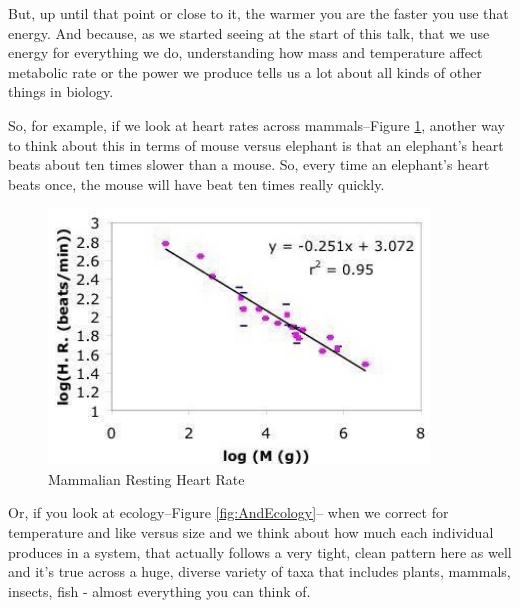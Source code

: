 \documentclass[]{article}
\begin{document}
But, up until that point or close to it,
the warmer you are
the faster you use that energy.
And because, as we started seeing
at the start of this talk,
that we use energy for everything we do,
understanding how mass
and temperature affect metabolic rate
or the power we produce
tells us a lot about all kinds of
other things in biology.

So, for example, if we look at
heart rates across mammals--Figure \ref{fig:MammalianRestingHeartRate},
another way to think about this
in terms of mouse versus elephant
is that an elephant's heart beats
about ten times slower than a mouse.
So, every time an elephant's heart
beats once,
the mouse will have beat
ten times really quickly.


\begin{figure}[H]
	\caption[Mammalian Resting Heart Rate]{Mammalian Resting Heart Rate\cite{savage2004predominance}}\label{fig:MammalianRestingHeartRate}
	\includegraphics[width=0.9\textwidth]{MammalianRestingHeartRate}
\end{figure}


Or, if you look at ecology--Figure \ref{fig:AndEcology}--
when we correct for temperature
and like versus size
and we think about how much
each individual produces in a system,
that actually follows a very tight,
clean pattern here as well
and it's true across a huge,
diverse variety of taxa
that includes plants, mammals,
insects, fish -
almost everything you can think of.
\end{document}
